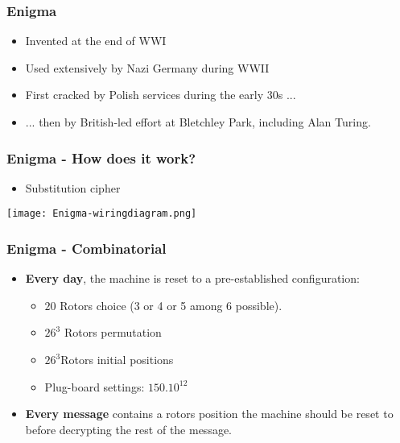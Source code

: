 \documentclass[
hyperref={pdfpagelabels=false}
,xcolor=table
]
{beamer}
\begin{document}
\begin{frame}
  \frametitle{Enigma}

  \begin{itemize}
  \item Invented at the end of WWI
  \item Used extensively by Nazi Germany during WWII
  \item First cracked by Polish services during the early 30s ... 
  \item ... then by British-led effort at Bletchley Park, including Alan Turing. 
  \end{itemize}
\end{frame}


\begin{frame}
  \frametitle{Enigma - How does it work?}

  \begin{itemize}
  \item Substitution cipher
  \end{itemize}

  \begin{center}
    \texttt{[image: Enigma-wiringdiagram.png]}
  \end{center}
 
\end{frame}


\begin{frame}
  \frametitle{Enigma - Combinatorial}
  \begin{itemize}
  \item \textbf{Every day}, the machine is reset to a pre-established configuration:
    \begin{itemize}
    \item $20$ Rotors choice (3 or 4 or 5 among 6 possible). 
    \item $26^3$ Rotors permutation 
    \item  $26^3$Rotors initial positions 
    \item Plug-board settings: $150.10^{12}$
    \end{itemize}
  \item \textbf{Every message} contains a rotors position the machine
    should be reset to before decrypting the rest of the message.
  \end{itemize}  
\end{frame}
\end{document}
